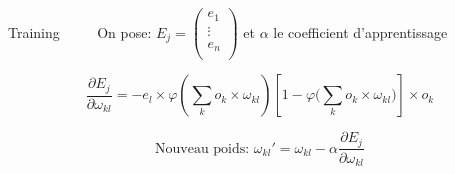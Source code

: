 \documentclass[10pt]{beamer}
\begin{document}
\begin{frame}{Training}
	$\quad \quad$ On pose: $E_j = \begin{pmatrix}
		e_1 \\
		\vdots \\
		e_n\\
	\end{pmatrix}$  et $\alpha$ le coefficient d'apprentissage

	\[\frac{\partial E_j}{\partial \omega_{kl}} = - e_l \times \varphi\left(\sum_k o_k \times \omega_{kl} \right)
	\left[1-\varphi\Big(\sum_k o_k \times \omega_{kl} \Big)\right]\times o_k\]	

	\[\text{Nouveau poids: } \omega_{kl}' = \omega_{kl} - \alpha \frac{\partial E_j}{\partial \omega_{kl}}\]
\end{frame}

\end{document}
